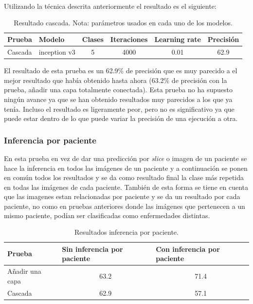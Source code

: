 \documentclass[12pt,a4paper]{article}
\begin{document}
Utilizando la técnica descrita anteriormente el resultado es el siguiente:

\begin{table}[H]
\centering
\begin{tabular}{|l|l|l|l|l|l|}
\hline
\textbf{Prueba} & \textbf{Modelo}                   & \textbf{Clases}        & \textbf{Iteraciones}      & \textbf{Learning rate}    & \textbf{Precisión}        \\ \hline
Cascada         & \multicolumn{1}{c|}{inception v3} & \multicolumn{1}{c|}{5} & \multicolumn{1}{c|}{4000} & \multicolumn{1}{c|}{0.01} & \multicolumn{1}{c|}{62.9} \\ \hline
\end{tabular}
\caption{Resultado cascada. Nota: parámetros usados en cada uno de los modelos.}
\end{table}

El resultado de esta prueba es un 62.9\% de precisión que es muy parecido a el mejor resultado que había obtenido hasta ahora (63.2\% de precisión con la prueba, añadir una capa totalmente conectada). Esta prueba no ha supuesto ningún avance ya que se han obtenido resultados muy parecidos a los que ya tenía. Incluso el resultado es ligeramente peor, pero no es significativo ya que puede estar dentro de lo que puede variar la precisión de una ejecución a otra.


\subsubsection{Inferencia por paciente}
En esta prueba en vez de dar una predicción por \textit{slice} o imagen de un paciente se hace la inferencia en todos las imágenes de un paciente y a continuación se ponen en común todos los resultados y se da como resultado final la clase más repetida en todas las imágenes de cada paciente. También de esta forma se tiene en cuenta que las imagenes estan relacionadas por paciente y se da un resultado por cada paciente, no como en pruebas anteriores donde las imágenes que pertenecen a un mismo paciente, podían ser clasificadas como enfermedades distintas.

\begin{table}[H]
\centering
\begin{tabular}{|l|c|c|}
\hline
\textbf{Prueba} & \multicolumn{1}{l|}{\textbf{Sin inferencia por paciente}} & \multicolumn{1}{l|}{\textbf{Con inferencia por paciente}} \\ \hline
Añadir una capa & 63.2                                                      & 71.4                                                      \\ \hline
Cascada         & 62.9                                                      & 57.1                                                      \\ \hline
\end{tabular}
\caption{Resultados inferencia por paciente.}
\end{table}
\end{document}
